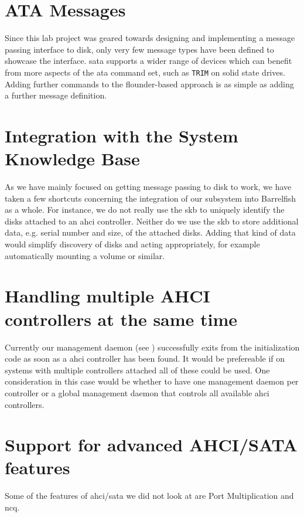 \section{ATA Messages}

Since this lab project was geared towards designing and implementing a message
passing interface to disk, only very few message types have been defined to
showcase the interface. \ac{sata} supports a wider range of devices which can
benefit from more aspects of the \ac{ata} command set, such as {\tt TRIM} on
solid state drives. Adding further commands to the flounder-based approach is
as simple as adding a further message definition.

\section{Integration with the System Knowledge Base}

As we have mainly focused on getting message passing to disk to work, we have
taken a few shortcuts concerning the integration of our subsystem into
Barrelfish as a whole. For instance, we do not really use the \acs{skb} to
uniquely identify the disks attached to an \ac{ahci} controller.  Neither do we
use the \acs{skb} to store additional data, e.g. serial number and size, of the
attached disks. Adding that kind of data would simplify discovery of disks and
acting appropriately, for example automatically mounting a volume or similar.

\section{Handling multiple AHCI controllers at the same time}

Currently our management daemon (see ) successfully exits
from the initialization code as soon as a \ac{ahci} controller has been found.
It would be prefereable if on systems with multiple controllers attached all of
these could be used. One consideration in this case would be whether to have
one management daemon per controller or a global management daemon that
controls all available \ac{ahci} controllers.

\section{Support for advanced AHCI/SATA features}

Some of the features of \ac{ahci}/\ac{sata} we did not look at are Port
Multiplication and \ac{ncq}.

